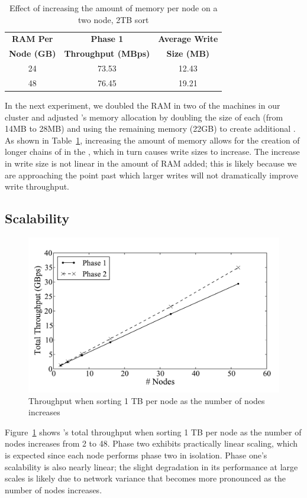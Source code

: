 \begin{table}
\centering
\caption{\label{table:bigmem}Effect of increasing the amount of memory per
  node on a two node, 2TB sort}
\begin{tabular}{|c|c|c|}
\hline
\textbf{RAM Per}  & \textbf{Phase 1}  & \textbf{Average Write} \\
\textbf{Node (GB)} & \textbf{Throughput (MBps)} & \textbf{Size (MB)} \\
\hline
24 & 73.53 & 12.43 \\
48 & 76.45 & 19.21 \\
\hline
\end{tabular}
\end{table}

In the next experiment, we doubled the RAM in two of the machines in our
cluster and adjusted \tritonsort's memory allocation by doubling the size of
each \writerbuffer (from 14MB to 28MB) and using the remaining memory (22GB)
to create additional \ldbuffers. As shown in Table~\ref{table:bigmem},
increasing the amount of memory allows for the creation of longer chains of
\ldbuffers in the \ldts, which in turn causes write sizes to increase. The
increase in write size is not linear in the amount of RAM added; this is likely
because we are approaching the point past which larger writes will not
dramatically improve write throughput.

\subsection{\tritonsort Scalability}

\begin{figure}[T]
    \centering
    \includegraphics[width=\columnwidth]{tritonsort/graphs/scalability.pdf}

    \caption{\label{fig:scalability}Throughput when sorting 1 TB per node as the number of nodes increases}
\end{figure}

Figure~\ref{fig:scalability} shows \tritonsort's total throughput when sorting
1 TB per node as the number of nodes increases from 2 to 48. Phase two exhibits
practically linear scaling, which is expected since each node performs phase
two in isolation.  Phase one's scalability is also nearly linear; the slight
degradation in its performance at large scales is likely due to network
variance that becomes more pronounced as the number of nodes increases.

